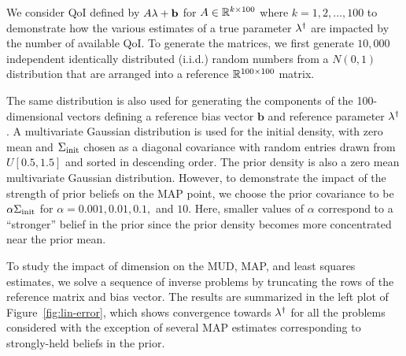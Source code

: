 We consider QoI defined by $A\lambda+\mathbf{b}$ for $A\in\mathbb{R}^{k\times 100}$ where $k=1,2,\ldots,100$ to demonstrate how the various estimates of a true parameter $\lambda^\dagger$ are impacted by the number of available QoI.
To generate the matrices, we first generate $10,000$ independent identically distributed (i.i.d.) random numbers from a $N(0,1)$ distribution that are arranged into a reference $\mathbb{R}^{100\times 100}$ matrix.

The same distribution is also used for generating the components of the 100-dimensional vectors defining a reference bias vector $\mathbf{b}$ and reference parameter $\lambda^\dagger$.
A multivariate Gaussian distribution is used for the initial density, with zero mean and $\Sigma_\text{init}$ chosen as a diagonal covariance with random entries drawn from $U[0.5, 1.5]$ and sorted in descending order.%
The prior density is also a zero mean multivariate Gaussian distribution.
However, to demonstrate the impact of the strength of prior beliefs on the MAP point, we choose the prior covariance to be $\alpha\Sigma_\text{init}$  for $\alpha=0.001, 0.01, 0.1, $ and $10$.
Here, smaller values of $\alpha$ correspond to a ``stronger'' belief in the prior since the prior density becomes more concentrated near the prior mean.


To study the impact of dimension on the MUD, MAP, and least squares estimates, we solve a
sequence of inverse problems by truncating the rows of the reference matrix and bias vector.
%
The results are summarized in the left plot of Figure~\ref{fig:lin-error}, which shows convergence towards $\lambda^\dagger$ for all the problems considered with the exception of several MAP estimates corresponding to strongly-held beliefs in the prior.


